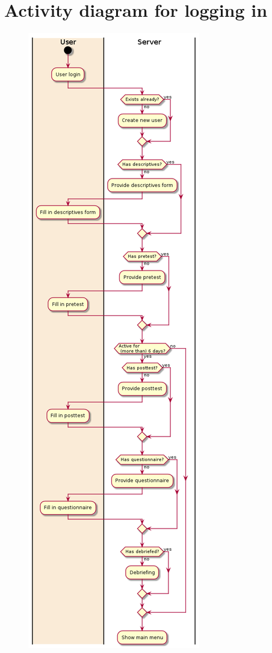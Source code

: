 \section{Activity diagram for logging in}
\label{app:loginactivity}
\begin{figure}[h!]
\centering
\includegraphics[height=\textheight-10ex]{img/loginactivity.png}
\end{figure}
